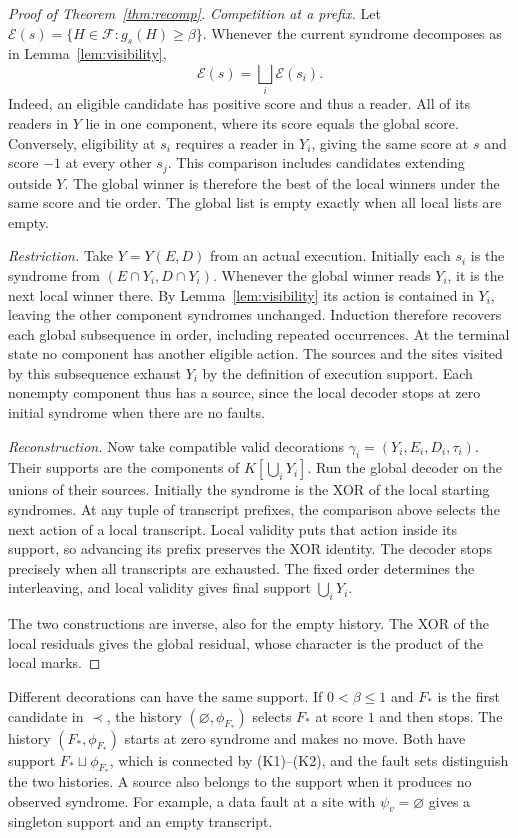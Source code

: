 \documentclass[10pt,twocolumn]{article}
\theoremstyle{definition}
\newcommand{\FF}{\mathcal{F}}
\begin{document}
\begin{proof}[Proof of Theorem~\ref{thm:recomp}]
\emph{Competition at a prefix.}
Let $\mathcal E(s)=\{H\in\FF:g_s(H)\ge\beta\}$. Whenever the current
syndrome decomposes as in Lemma~\ref{lem:visibility},
\[
 \mathcal E(s)=\bigsqcup_i\mathcal E(s_i).
\]
Indeed, an eligible candidate has positive score and thus a reader.
All of its readers in $Y$ lie in one component, where its score equals
the global score. Conversely, eligibility at $s_i$ requires a reader
in $Y_i$, giving the same score at $s$ and score $-1$ at every other
$s_j$. This comparison includes candidates extending outside $Y$.
The global winner is therefore the best of the local winners under the
same score and tie order. The global list is empty exactly when all
local lists are empty.

\emph{Restriction.}
Take $Y=Y(E,D)$ from an actual execution. Initially each $s_i$ is the
syndrome from $(E\cap Y_i,D\cap Y_i)$. Whenever the global winner
reads $Y_i$, it is the next local winner there. By
Lemma~\ref{lem:visibility} its action is contained in $Y_i$, leaving
the other component syndromes unchanged. Induction therefore recovers
each global subsequence in order, including repeated occurrences.
At the terminal state no component has another eligible action.
The sources and the sites visited by this subsequence exhaust $Y_i$
by the definition of execution support. Each nonempty component thus
has a source, since the local decoder stops at zero initial syndrome
when there are no faults.

\emph{Reconstruction.}
Now take compatible valid decorations $\gamma_i=(Y_i,E_i,D_i,\tau_i)$.
Their supports are the components of $K[\bigcup_iY_i]$. Run the global
decoder on the unions of their sources. Initially the syndrome is the
XOR of the local starting syndromes. At any tuple of transcript prefixes,
the comparison above selects the next action of a local transcript.
Local validity puts that action inside its support, so advancing its
prefix preserves the XOR identity. The decoder stops precisely when
all transcripts are exhausted. The fixed order determines the interleaving,
and local validity gives final support $\bigcup_iY_i$.

The two constructions are inverse, also for the empty history. The
XOR of the local residuals gives the global residual, whose character
is the product of the local marks.
\end{proof}

Different decorations can have the same support. If $0<\beta\le1$
and $F_\ast$ is the first candidate in $\prec$, the
history $(\varnothing,\phi_{F_\ast})$ selects $F_\ast$ at score $1$ and
then stops. The history $(F_\ast,\phi_{F_\ast})$ starts at zero syndrome
and makes no move. Both have support $F_\ast\sqcup\phi_{F_\ast}$, which
is connected by (K1)--(K2), and the fault sets distinguish the two
histories. A source also belongs to the support when it produces no
observed syndrome. For example, a data fault at a site with
$\psi_v=\varnothing$ gives a singleton support and an empty transcript.
\end{document}
